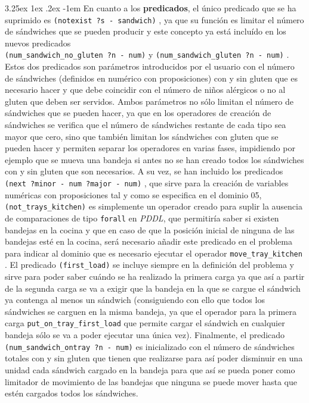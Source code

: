 \documentclass{article}
\makeatletter
\newcommand{\cool}[1] {
        {\texttt{#1}}
    }
\renewcommand\paragraph{\@startsection{paragraph}{5}{\z@}%
      {3.25ex \@plus1ex \@minus.2ex}%
      {-1em}%
      {\normalfont\normalsize\bfseries}}
\makeatother
\begin{document}
    \paragraph{}
    En cuanto a los \textbf{predicados}, el único predicado que se ha suprimido es \cool{(notexist ?s - sandwich)}, ya que su función es limitar el número de sándwiches que se pueden producir y este concepto ya está incluído en los nuevos predicados \\ \cool{(num\_sandwich\_no\_gluten ?n - num)} y \cool{(num\_sandwich\_gluten ?n - num)}. Estos dos predicados son parámetros introducidos por el usuario con el número de sándwiches (definidos en numérico con proposiciones) con y sin gluten que es necesario hacer y que debe coincidir con el número de niños alérgicos o no al gluten que deben ser servidos. Ambos parámetros no sólo limitan el número de sándwiches que se pueden hacer, ya que en los operadores de creación de sándwiches se verifica que el número de sándwiches restante de cada tipo sea mayor que cero, sino que también limitan los sándwiches con gluten que se pueden hacer y permiten separar los operadores en varias fases, impidiendo por ejemplo que se mueva una bandeja si antes no se han creado todos los sándwiches con y sin gluten que son necesarios. A su vez, se han incluido los predicados \cool{(next ?minor - num ?major - num)}, que sirve para la creación de variables numéricas con proposiciones tal y como se especifica en el dominio 05, \cool{(not\_trays\_kitchen)} es simplemente un operador creado para suplir la ausencia de comparaciones de tipo \cool{forall} en \textit{PDDL}, que permitiría saber si existen bandejas en la cocina y que en caso de que la posición inicial de ninguna de las bandejas esté en la cocina, será necesario añadir este predicado en el problema para indicar al dominio que es necesario ejecutar el operador \cool{move\_tray\_kitchen}. El predicado \cool{(first\_load)} se incluye siempre en la definición del problema y sirve para poder saber cuándo se ha realizado la primera carga ya que así a partir de la segunda carga se va a exigir que la bandeja en la que se cargue el sándwich ya contenga al menos un sándwich (consiguiendo con ello que todos los sándwiches se carguen en la misma bandeja, ya que el operador para la primera carga \cool{put\_on\_tray\_first\_load} que permite cargar el sándwich en cualquier bandeja sólo se va a poder ejecutar una única vez). Finalmente, el predicado \cool{(num\_sandwich\_ontray ?n - num)} es inicializado con el número de sándwiches totales con y sin gluten que tienen que realizarse para así poder disminuir en una unidad cada sándwich cargado en la bandeja para que así se pueda poner como limitador de movimiento de las bandejas que ninguna se puede mover hasta que estén cargados todos los sándwiches.
    
\end{document}
